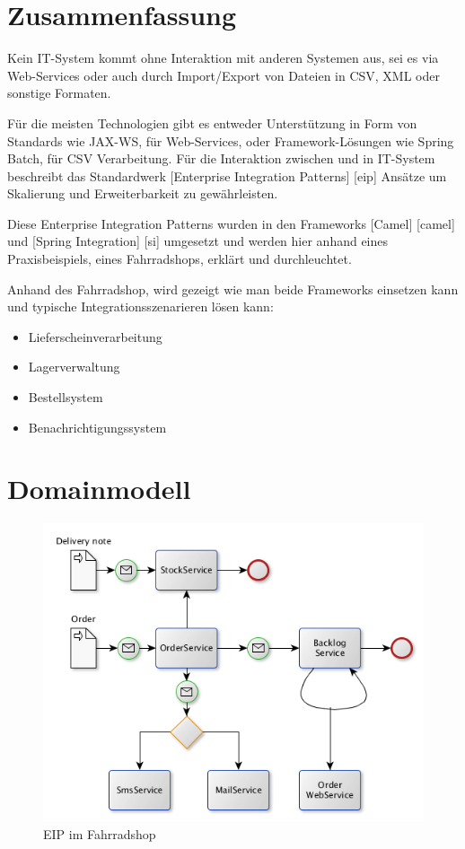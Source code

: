 \documentclass[12pt,a4paper,ngerman]{article}
\author{}
\date{}
\makeatletter
\def\maxwidth{\ifdim\Gin@nat@width>\linewidth\linewidth
\else\Gin@nat@width\fi}
\let\Oldincludegraphics\includegraphics
\renewcommand{\includegraphics}[1]{\Oldincludegraphics[width=\maxwidth]{#1}}
\makeatother
\begin{document}
\section{Zusammenfassung}

Kein IT-System kommt ohne Interaktion mit anderen Systemen aus, sei es
via Web-Services oder auch durch Import/Export von Dateien in CSV, XML
oder sonstige Formaten.

Für die meisten Technologien gibt es entweder Unterstützung in Form von
Standards wie JAX-WS, für Web-Services, oder Framework-Lösungen wie
Spring Batch, für CSV Verarbeitung. Für die Interaktion zwischen und in
IT-System beschreibt das Standardwerk {[}Enterprise Integration
Patterns{]} {[}eip{]} Ansätze um Skalierung und Erweiterbarkeit zu
gewährleisten.

Diese Enterprise Integration Patterns wurden in den Frameworks
{[}Camel{]} {[}camel{]} und {[}Spring Integration{]} {[}si{]} umgesetzt
und werden hier anhand eines Praxisbeispiels, eines Fahrradshops,
erklärt und durchleuchtet.

Anhand des Fahrradshop, wird gezeigt wie man beide Frameworks einsetzen
kann und typische Integrationsszenarieren lösen kann:

\begin{itemize}
\item
  Lieferscheinverarbeitung
\item
  Lagerverwaltung
\item
  Bestellsystem
\item
  Benachrichtigungssystem
\end{itemize}

\section{Domainmodell}

\begin{figure}[htbp]
\centering
\includegraphics{eip.png}
\caption{EIP im Fahrradshop}
\end{figure}
\end{document}
